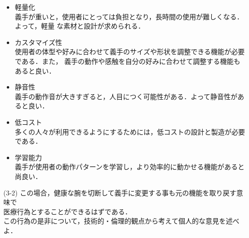 \documentclass{jsarticle}
\begin{document}
\begin{itemize}
  \item  軽量化\\
  \hspace*{5.5zw}義手が重いと，使用者にとっては負担となり，長時間の使用が難しくなる．よって，軽量
  \hspace*{5.5zw}な素材と設計が求められる．\\

  \item カスタマイズ性\\
  \hspace*{5.5zw}使用者の体型や好みに合わせて義手のサイズや形状を調整できる機能が必要である．また，
  \hspace*{5.5zw}義手の動作や感触を自分の好みに合わせて調整する機能もあると良い．\\

  \item 静音性\\
  \hspace*{5.5zw}義手の動作音が大きすぎると，人目につく可能性がある．よって静音性があると良い．\\

  \item 低コスト\\
  \hspace*{5.5zw}多くの人々が利用できるようにするためには，低コストの設計と製造が必要である．\\

  \item  学習能力\\
  \hspace*{5.5zw}義手が使用者の動作パターンを学習し，より効率的に動かせる機能があると尚良い．\\


  


  
\end{itemize}

\hspace*{4.7zw}(3-2) この場合，健康な腕を切断して義手に変更する事も元の機能を取り戻す意味で\\
\hspace*{8.4zw}医療行為とすることができるはずである．\\
\hspace*{8.4zw}この行為の是非について，技術的・倫理的観点から考えて個人的な意見を述べよ．\\
\end{document}
